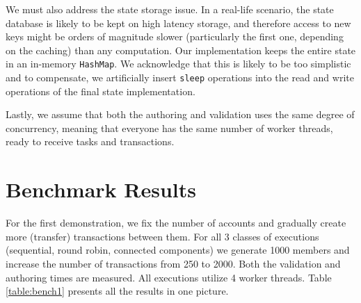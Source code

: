 We must also address the state storage issue. In a real-life scenario, the state database is likely to be kept on high latency storage, and therefore access to
new keys might be orders of magnitude slower (particularly the first one, depending on the caching)
than any computation. Our implementation keeps the entire state in an in-memory \texttt{HashMap}. We
acknowledge that this is likely to be too simplistic and to compensate, we artificially insert
\texttt{sleep} operations into the read and write operations of the final state implementation.

Lastly, we assume that both the authoring and validation uses the same degree of concurrency, meaning that everyone has the
same number of worker threads, ready to receive tasks and transactions.

\section{Benchmark Results} \label{chap_b&a:sec:results}

For the first demonstration, we fix the number of accounts and gradually create more (transfer)
transactions between them. 
For all 3 classes of executions (sequential, round robin, connected components) we generate 1000 members and increase
the number of transactions from 250 to 2000. Both the validation and authoring times are measured.
All executions utilize 4 worker threads.
Table \ref{table:bench1} presents all the results in one picture. 

